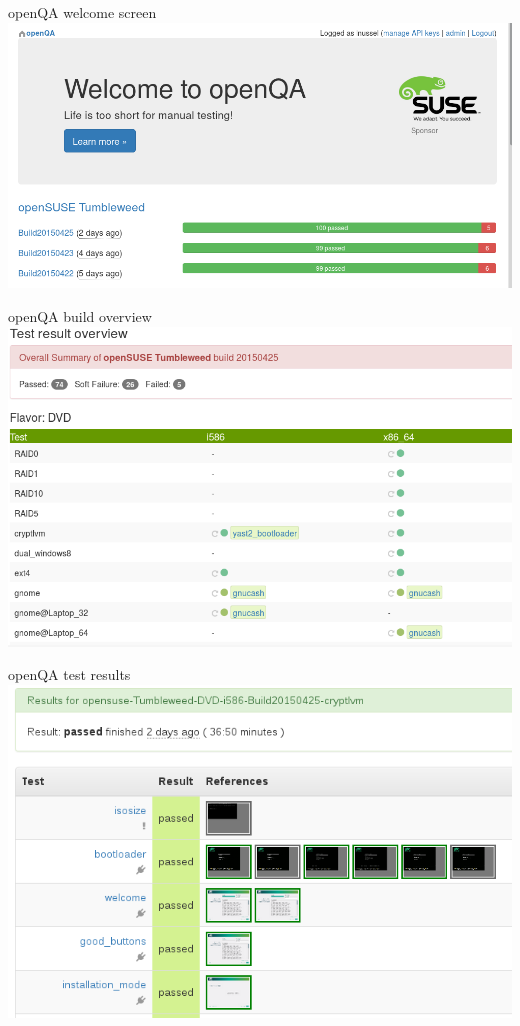 \documentclass[
]{beamer}
\begin{document}
\begin{frame}{openQA welcome screen}
  \includegraphics[width=.8\paperwidth]{openqa.png}
\end{frame}

\begin{frame}{openQA build overview}
  \includegraphics[width=.8\paperwidth]{openqa-buildoverview.png}
\end{frame}

\begin{frame}{openQA test results}
  \includegraphics[width=.8\paperwidth]{openqa-testresults.png}
\end{frame}
\end{document}
